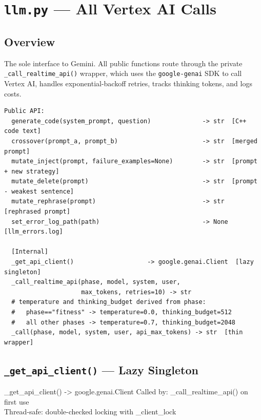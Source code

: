 \documentclass[11pt,a4paper]{report}
\newcommand{\fn}[1]{\texttt{#1}}
\newcommand{\pyf}[1]{\texttt{#1}}
\begin{document}
\chapter{\pyf{llm.py} --- All Vertex AI Calls}

\section{Overview}

The sole interface to Gemini.  All public functions route through the private
\fn{\_call\_realtime\_api()} wrapper, which uses the \fn{google-genai} SDK to call
Vertex AI, handles exponential-backoff retries, tracks thinking tokens, and logs costs.

\begin{lstlisting}[style=chain]
Public API:
  generate_code(system_prompt, question)              -> str  [C++ code text]
  crossover(prompt_a, prompt_b)                       -> str  [merged prompt]
  mutate_inject(prompt, failure_examples=None)        -> str  [prompt + new strategy]
  mutate_delete(prompt)                               -> str  [prompt - weakest sentence]
  mutate_rephrase(prompt)                             -> str  [rephrased prompt]
  set_error_log_path(path)                            -> None [llm_errors.log]

  [Internal]
  _get_api_client()                    -> google.genai.Client  [lazy singleton]
  _call_realtime_api(phase, model, system, user,
                     max_tokens, retries=10) -> str
  # temperature and thinking_budget derived from phase:
  #   phase=="fitness" -> temperature=0.0, thinking_budget=512
  #   all other phases -> temperature=0.7, thinking_budget=2048
  _call(phase, model, system, user, api_max_tokens) -> str  [thin wrapper]
\end{lstlisting}

\section{\fn{\_get\_api\_client()} --- Lazy Singleton}

\begin{spec}{\_get\_api\_client() -> google.genai.Client}
Called by: \_call\_realtime\_api() on first use \\
Thread-safe: double-checked locking with \_client\_lock
\end{spec}
\end{document}
